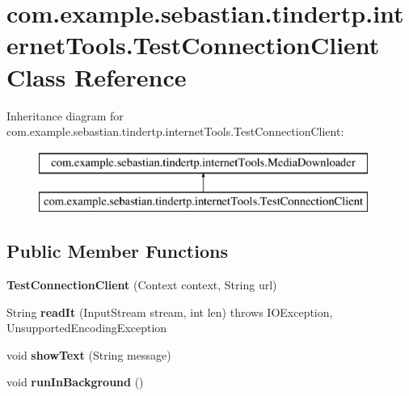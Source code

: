 \hypertarget{classcom_1_1example_1_1sebastian_1_1tindertp_1_1internetTools_1_1TestConnectionClient}{}\section{com.\+example.\+sebastian.\+tindertp.\+internet\+Tools.\+Test\+Connection\+Client Class Reference}
\label{classcom_1_1example_1_1sebastian_1_1tindertp_1_1internetTools_1_1TestConnectionClient}
Inheritance diagram for com.\+example.\+sebastian.\+tindertp.\+internet\+Tools.\+Test\+Connection\+Client\+:\begin{figure}[H]
\begin{center}
\leavevmode
\includegraphics[height=2.000000cm]{classcom_1_1example_1_1sebastian_1_1tindertp_1_1internetTools_1_1TestConnectionClient}
\end{center}
\end{figure}
\subsection*{Public Member Functions}
\begin{DoxyCompactItemize}
\item 
{\bfseries Test\+Connection\+Client} (Context context, String url)\hypertarget{classcom_1_1example_1_1sebastian_1_1tindertp_1_1internetTools_1_1TestConnectionClient_a35848eacaea39cf8a64e5bc51267efc2}{}\label{classcom_1_1example_1_1sebastian_1_1tindertp_1_1internetTools_1_1TestConnectionClient_a35848eacaea39cf8a64e5bc51267efc2}

\item 
String {\bfseries read\+It} (Input\+Stream stream, int len)  throws I\+O\+Exception, Unsupported\+Encoding\+Exception \hypertarget{classcom_1_1example_1_1sebastian_1_1tindertp_1_1internetTools_1_1TestConnectionClient_a82fa513fc2f666b7b85a5f0f6e4ceca6}{}\label{classcom_1_1example_1_1sebastian_1_1tindertp_1_1internetTools_1_1TestConnectionClient_a82fa513fc2f666b7b85a5f0f6e4ceca6}

\item 
void {\bfseries show\+Text} (String message)\hypertarget{classcom_1_1example_1_1sebastian_1_1tindertp_1_1internetTools_1_1TestConnectionClient_a820fe26eac210188c284dc37760017d3}{}\label{classcom_1_1example_1_1sebastian_1_1tindertp_1_1internetTools_1_1TestConnectionClient_a820fe26eac210188c284dc37760017d3}

\item 
void {\bfseries run\+In\+Background} ()\hypertarget{classcom_1_1example_1_1sebastian_1_1tindertp_1_1internetTools_1_1TestConnectionClient_a43f1f6d1cb7a23a3785dc4075996dba2}{}\label{classcom_1_1example_1_1sebastian_1_1tindertp_1_1internetTools_1_1TestConnectionClient_a43f1f6d1cb7a23a3785dc4075996dba2}

\end{DoxyCompactItemize}
